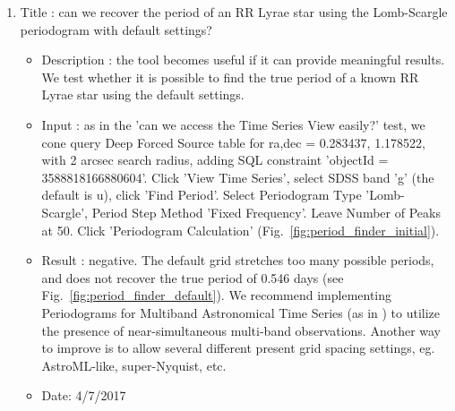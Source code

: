 \documentclass[DM,lsstdraft,toc,usenatbib]{lsstdoc}
\begin{document}
\begin{enumerate}
   \item Title : can we recover the period of an RR Lyrae star using the Lomb-Scargle periodogram with default settings? 
    \begin{itemize}
      \item Description : the tool becomes useful if it can provide meaningful results.  We test whether it is possible to find the true period of a known RR Lyrae star using the default  settings. 
      \item Input : as in the 'can we access the Time Series View easily?' test,  we cone query Deep Forced Source table for ra,dec = 0.283437\degree, 1.178522\degree, with 2 arcsec search radius, adding SQL constraint 'objectId = 3588818166880604'. Click 'View Time Series', select SDSS band 'g' (the default is u), click 'Find Period'. Select Periodogram Type 'Lomb-Scargle', Period Step Method 'Fixed Frequency'. Leave Number of Peaks at 50. Click 'Periodogram Calculation' (Fig.~\ref{fig:period_finder_initial}). 
      \item Result : negative. The default grid stretches too many possible periods, and does not recover the true period of 0.546 days (see Fig.~\ref{fig:period_finder_default}). We recommend implementing  Periodograms for Multiband Astronomical Time Series (as in \cite{vanderplas2015}) to utilize the presence of near-simultaneous multi-band observations. Another way to improve is to allow several different present grid spacing settings,  eg.  AstroML-like, super-Nyquist, etc.  
      \item Date: 4/7/2017
    \end{itemize}


\end{enumerate}
\end{document}
